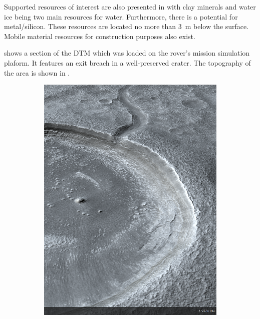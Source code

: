 Supported resources of interest are also presented in  with clay minerals and water ice being two main resources for water. Furthermore, there is a potential for metal/silicon. These resources are located no more than \SI{3}{\meter} below the surface. Mobile material resources for construction purposes also exist.

 shows a section of the \ac{DTM} which was loaded on the rover's mission simulation plaform. It features an exit breach in a well-preserved crater. The topography of the area is shown in .
\vspace{0.5cm}

\begin{figure}[h]
\captionsetup[subfigure]{justification=centering}
\vspace{-2ex}
	\centering
    \setlength{\subfigureWidth}{0.50\textwidth}
    \setlength{\graphicsHeight}{70mm}
    \hypersetup{hidelinks=true}%
    \begin{subfigure}[t]{\subfigureWidth}
        \centering
        \includegraphics[height=\graphicsHeight]{sections/mars-solar-energy/mission-sites/images/ismenius-cavus-dtm.png}

\end{subfigure}
\end{figure}
